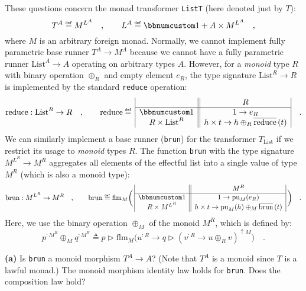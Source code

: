 These questions concern the monad transformer \lstinline!ListT! (here
denoted just by $T$): 
\[
T^{A}\triangleq M^{L^{A}}\quad,\quad\quad L^{A}\triangleq\bbnum 1+A\times M^{L^{A}}\quad,
\]
where $M$ is an arbitrary foreign monad. Normally, we cannot implement
fully parametric base runner $T^{A}\rightarrow M^{A}$ because we
cannot have a fully parametric runner $\text{List}^{A}\rightarrow A$
operating on arbitrary types $A$. However, for a \emph{monoid} type
$R$ with binary operation $\oplus_{R}$ and empty element $e_{R}$,
the type signature $\text{List}^{R}\rightarrow R$ is implemented
by the standard \lstinline!reduce! operation: 
\[
\text{reduce}:\text{List}^{R}\rightarrow R\quad,\quad\quad\text{reduce}\triangleq\,\begin{array}{|c||c|}
 & R\\
\hline \bbnum 1 & 1\rightarrow e_{R}\\
R\times\text{List}^{R} & h\times t\rightarrow h\oplus_{R}\overline{\text{reduce}}\,(t)
\end{array}\quad.
\]
We can similarly implement a base runner (\lstinline!brun!) for the
transformer $T_{\text{List}}$ if we restrict its usage to \emph{monoid}
types $R$. The function \lstinline!brun! with the type signature
$M^{L^{R}}\rightarrow M^{R}$ aggregates all elements of the effectful
list into a single value of type $M^{R}$ (which is also a monoid
type):
\[
\text{brun}:M^{L^{R}}\rightarrow M^{R}\quad,\quad\quad\text{brun}\triangleq\text{flm}_{M}\bigg(\,\begin{array}{|c||c|}
 & M^{R}\\
\hline \bbnum 1 & 1\rightarrow\text{pu}_{M}(e_{R})\\
R\times M^{L^{R}} & h\times t\rightarrow\text{pu}_{M}(h)\oplus_{M}\overline{\text{brun}}\,(t)
\end{array}\,\bigg)\quad.
\]
Here, we use the binary operation $\oplus_{M}$ of the monoid $M^{R}$,
which is defined by:
\[
p^{:M^{R}}\oplus_{M}q^{:M^{R}}\triangleq p\triangleright\text{flm}_{M}\big(u^{:R}\rightarrow q\triangleright(v^{:R}\rightarrow u\oplus_{R}v)^{\uparrow M}\big)\quad.
\]

\textbf{(a)} Is \lstinline!brun! a monoid morphism $T^{A}\rightarrow A$?
(Note that $T^{A}$ is a monoid since $T$ is a lawful monad.) The
monoid morphism identity law holds for \lstinline!brun!. Does the
composition law hold?

